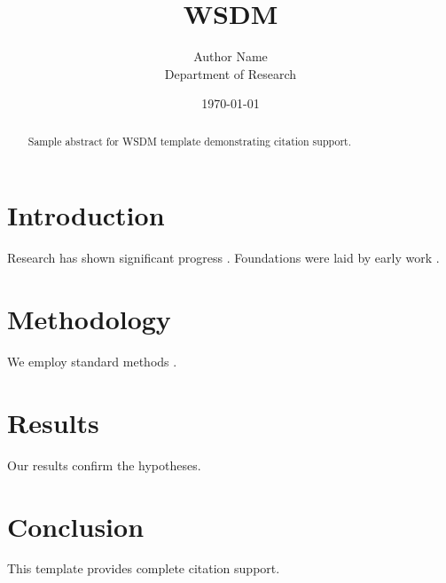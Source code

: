 \documentclass{article}
\title{WSDM}
\author{Author Name \\ \small Department of Research}
\date{\today}
\begin{document}
\maketitle

\begin{abstract}
Sample abstract for WSDM template demonstrating citation support.
\end{abstract}

\section{Introduction}
Research has shown significant progress \citep{einstein1905}. Foundations were laid by early work \citep{turing1950}.

\section{Methodology}
We employ standard methods \citep{knuth1984}.

\section{Results}
Our results confirm the hypotheses.

\section{Conclusion}
This template provides complete citation support.



\end{document}

